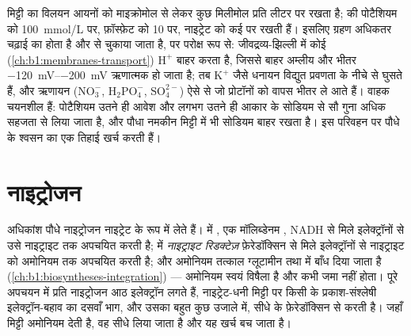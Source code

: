 \begin{proposition}\label{prop:b1:plant-water-minerals:uptake}
मिट्टी का विलयन आयनों को माइक्रोमोल से लेकर कुछ मिलीमोल प्रति लीटर पर
रखता है;  की  पोटैशियम को \qty{100}{mmol/L} पर, फ़ॉस्फ़ेट को
\qty{10}{} पर, नाइट्रेट को कई पर रखती हैं। इसलिए ग्रहण अधिकतर चढ़ाई का
होता है और  से चुकाया जाता है, पर परोक्ष रूप से: जीवद्रव्य-झिल्ली में
कोई \emph{} (\cref{ch:b1:membranes-transport})
$\mathrm{H^+}$ बाहर करता है, जिससे बाहर अम्लीय और भीतर
\qtyrange{-120}{-200}{mV} ऋणात्मक हो जाता है; तब $\mathrm{K^+}$ जैसे
धनायन विद्युत प्रवणता के नीचे  से घुसते हैं, और ऋणायन
($\mathrm{NO_3^-}$, $\mathrm{H_2PO_4^-}$, $\mathrm{SO_4^{2-}}$) ऐसे
 से जो प्रोटॉनों को वापस भीतर ले आते हैं। वाहक चयनशील हैं:
पोटैशियम उतने ही आवेश और लगभग उतने ही आकार के सोडियम से सौ गुना अधिक
सहजता से लिया जाता है, और पौधा नमकीन मिट्टी में भी सोडियम बाहर रखता है।
 इस परिवहन पर पौधे के श्वसन का एक तिहाई खर्च करती हैं।
\end{proposition}

\section{नाइट्रोजन}

\begin{proposition}[नाइट्रेट से ऐमीनो अम्ल तक]\label{prop:b1:plant-water-minerals:nitrate}
अधिकांश पौधे नाइट्रोजन नाइट्रेट के रूप में लेते हैं।  में
\emph{}, एक मॉलिब्डेनम , NADH से मिले
इलेक्ट्रॉनों से उसे नाइट्राइट तक अपचयित करती है;  में \emph{नाइट्राइट
रिडक्टेज़} फ़ेरेडॉक्सिन से मिले इलेक्ट्रॉनों से नाइट्राइट को अमोनियम तक
अपचयित करती है; और अमोनियम तत्काल ग्लूटामीन तथा  में बाँध दिया
जाता है (\cref{ch:b1:biosyntheses-integration}) --- अमोनियम स्वयं विषैला
है और कभी जमा नहीं होता। पूरे अपचयन में प्रति नाइट्रोजन आठ इलेक्ट्रॉन
लगते हैं, नाइट्रेट-धनी मिट्टी पर किसी  के प्रकाश-संश्लेषी
इलेक्ट्रॉन-बहाव का दसवाँ भाग, और  उसका बहुत कुछ उजाले में, सीधे
 के फ़ेरेडॉक्सिन से करती है। जहाँ मिट्टी अमोनियम देती है, वह सीधे
लिया जाता है और यह खर्च बच जाता है।
\end{proposition}

